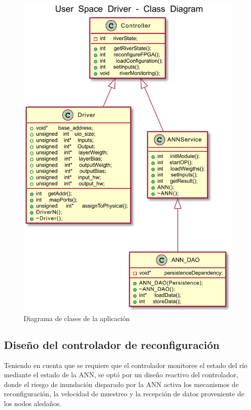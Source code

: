 \begin{figure}[!ht]
	\centering
		\includegraphics[scale=0.8]{Figures/driverANN}
	\caption{Diagrama de clases de la aplicación}
	\label{fig:userSpaceDriverModel}
\end{figure}

\subsection{Diseño del controlador de reconfiguración}

Teniendo en cuenta que se requiere que el controlador monitoree el estado del río mediante el estado de la ANN, se optó por un diseño reactivo del controlador, donde el riesgo de inundación disparado por la ANN activa los mecanismos de reconfiguración, la velocidad de muestreo y la recepción de datos proveniente de los nodos aledaños.

